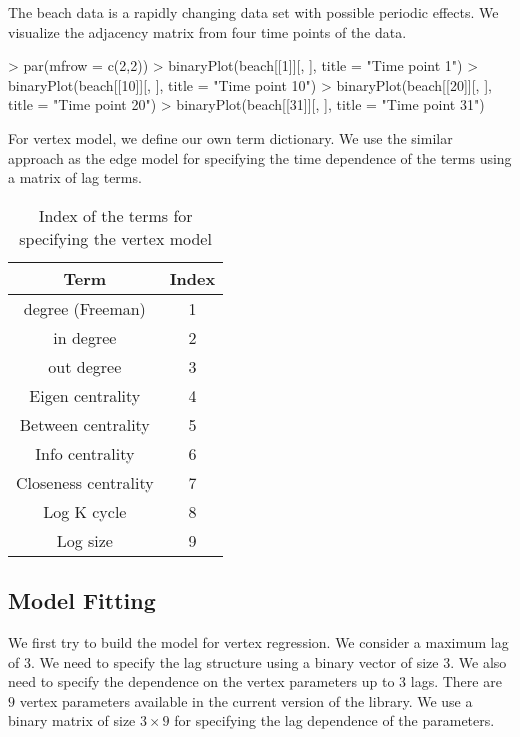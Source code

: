 \documentclass[12pt]{article}
\begin{document}
The beach data is a rapidly changing data set with possible periodic effects. We visualize the adjacency matrix from four time points of the data.

\begin{Schunk}
\begin{Sinput}
> par(mfrow = c(2,2))
> binaryPlot(beach[[1]][, ], title = "Time point 1")
> binaryPlot(beach[[10]][, ], title = "Time point 10")
> binaryPlot(beach[[20]][, ], title = "Time point 20")
> binaryPlot(beach[[31]][, ], title = "Time point 31")
\end{Sinput}
\end{Schunk}

For vertex model, we define our own term dictionary. We use the similar approach as the edge model for specifying the time dependence of the terms using a matrix of lag terms.

\begin{table}[h]
  \centering
  \begin{tabular}[h]{|c|c|}
    \hline
    Term & Index \\
    \hline
    degree (Freeman) & 1 \\
    in degree & 2 \\
    out degree & 3 \\
    Eigen centrality & 4 \\
    Between centrality & 5 \\
    Info centrality & 6 \\
    Closeness centrality & 7 \\
    Log K cycle & 8 \\
    Log size & 9 \\
    \hline
  \end{tabular}
  \caption{Index of the terms for specifying the vertex model}
\end{table}

\subsection{Model Fitting}
\label{sec:model-fitting-beach}

We first try to build the model for vertex regression. We consider a maximum lag of 3. We need to specify the lag structure using a binary vector of size 3. We also need to specify the dependence on the vertex parameters up to 3 lags. There are $9$ vertex parameters available in the current version of the library. We use a binary matrix of size $3 \times 9$ for specifying the lag dependence of the parameters.
\end{document}
